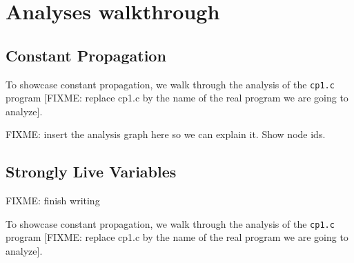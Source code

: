 \documentclass{article}
\begin{document}
\section{Analyses walkthrough}

\subsection*{Constant Propagation}

To showcase constant propagation, we walk through the analysis of the \texttt{cp1.c} program [FIXME: replace cp1.c by the name of the real program we are going to analyze].

FIXME: insert the analysis graph here so we can explain it. Show node ids.

\subsection*{Strongly Live Variables}

FIXME: finish writing

To showcase constant propagation, we walk through the analysis of the \texttt{cp1.c} program [FIXME: replace cp1.c by the name of the real program we are going to analyze].
\end{document}
